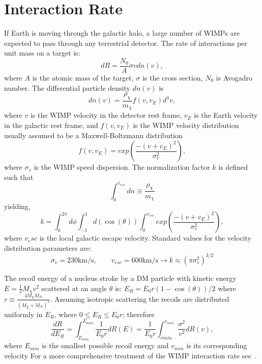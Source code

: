 \section{Interaction Rate}
If Earth is moving through the galactic halo, a large number of WIMPs are expected to pass through any terrestrial detector. The rate of interactions per unit mass on a target is:
\begin{equation}
dR = \frac{N_0}{A}\sigma v dn(v),
\end{equation} 
where $A$ is the atomic mass of the target, $\sigma$ is the cross section, $N_0$ is Avogadro number. The differential particle density $dn(v)$ is
\begin{equation}
dn(v) = \frac{\rho_{\chi}}{m_{\chi}} f(v,v_E)d^3 v,
\end{equation}
where $v$ is the WIMP velocity in the detector rest frame, $v_E$ is the Earth velocity in the galactic rest frame, and $f(v,v_E)$ is the WIMP velocity distribution usually assumed to be a Maxwell-Boltzmann distribution
\begin{equation}
f(v,v_E) = exp\left(\frac{-(v+v_E)^2}{\sigma_v ^2}\right),
\end{equation} 
where $\sigma_v$ is the WIMP speed dispersion. The normalization factor $k$ is defined such that
\begin{equation}
\int_0^{v_{esc}} dn \equiv \frac{\rho_\chi}{m_\chi} 
\end{equation}
yielding,
\begin{equation}
k = \int_0^{2\pi}d\phi \int_{-1}^1d(\cos(\theta)) \int_0^{v_{esc}} exp\left(\frac{-(v+v_E)^2}{\sigma_v ^2}\right),
\end{equation}
where $v_esc$ is the  local galactic escape velocity. Standard values for the velocity distribution parameters are:
\begin{equation}
\sigma_v = 230\mathrm{km/s}, \qquad v_{esc} = 600\mathrm{km/s} \rightarrow k \approx (\pi \sigma_v^2)^{3/2}
\end{equation} 

The recoil energy of a nucleus stroke by a DM particle with kinetic energy $E = \frac{1}{2}M_\chi v^2$ scattered at an angle $\theta$ is: $E_R = E_0r(1-\cos(\theta))/2$ where $r \equiv \frac{4M_\chi M_N}{(M_\chi + M_N)^2}$. Assuming isotropic scattering the recoils are distributed uniformly in $E_R$, where $0 \leq E_R \leq E_0 r$; therefore
\begin{equation}
\frac{dR}{dE_R} = \int_{E_{min}}^{E_{max}} \frac{1}{E_0 r}dR(E) = \frac{1}{E_0r}\int_{v{min}}^{v_{max}}\frac{\sigma^2}{v^2}dR(v),
\end{equation} 
where $E_{min}$ is the smallest possible recoil energy and $v_{min}$ is its corresponding velocity For a more comprehensive treatment of the WIMP interaction rate see~\cite{LEWIN}.



